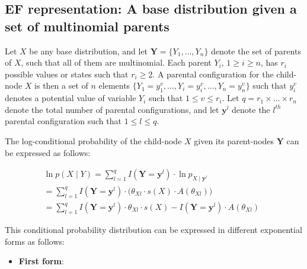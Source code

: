 \documentclass[11pt, oneside]{article}   	%
\numberwithin{figure}{section}
\numberwithin{equation}{section}
\numberwithin{table}{section}
\theoremstyle{definition}
\begin{document}
\begin{appendices}
\section{EF representation: A base distribution given a set of multinomial parents}

Let $X$ be any base distribution, and let $\mathbf{Y} =\{Y_1,\ldots,Y_n\}$ denote the set of parents of $X$, such that all of them are multinomial. Each parent $Y_i$, $1 \geq i \geq n$, has $r_i$ possible values or states such that $r_i \geq 2$. A parental configuration for the child-node $X$ is then a set of $n$ elements $\{Y_1 = y_1^{v}, \ldots, Y_i = y_i^{v},\ldots, Y_n = y_n^{v} \}$ such that $y_i^{v}$ denotes a potential value of variable $Y_i$ such that  $1 \leq v \leq r_i$. Let $q = r_1 \times \ldots \times r_n$ denote the total number of parental configurations, and let $\mathbf{y}^l$ denote the $l^{th}$ parental configuration such that $1 \leq l \leq q$.

The log-conditional probability of the child-node $X$ given its parent-nodes $\mathbf{Y}$ can be expressed as follows:

\begin{eqnarray*}
\ln p(X \mid Y) =  \sum_{l=1}^q I(\mathbf{Y} =\mathbf{y}^l) \cdot \ln p_{X \mid \mathbf{y}^l} ~~~~~~~~~~~~~~~~~~~~~~~~~~~~~~~\\
= \sum_{l=1}^q I(\mathbf{Y} =\mathbf{y}^l) \cdot \Big(  \theta_{Xl}   \cdot  s(X)  \cdot  A(\theta_{Xl}) \Big)~~~~~~~~~~~~~\\
= \sum_{l=1}^q I(\mathbf{Y} =\mathbf{y}^l) \cdot \theta_{Xl} \cdot s(X) - I(\mathbf{Y} =\mathbf{y}^l) \cdot A(\theta_{Xl})
\end{eqnarray*}

This conditional probability distribution can be expressed in different exponential forms as follows:

\begin{itemize}

\item \textbf{First form}:


\end{itemize}
\end{appendices}
\end{document}
